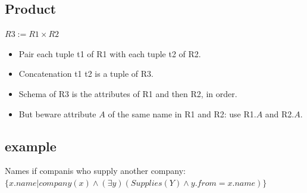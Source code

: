 \documentclass[a4paper]{article}
\begin{document}
        \subsection{Product}
            \begin{center}
                $R3:= R1 \times R2$
            \end{center}
            \begin{itemize}
                \item Pair each tuple t1 of R1 with each tuple t2 of R2.
                \item Concatenation t1 t2 is a tuple of R3.
                \item Schema of R3 is the attributes of R1 and then R2, in order.
                \item But beware attribute $A$ of the same name in R1 and R2: use R1.$A$ and R2.$A$.
            \end{itemize}
        \subsection{example}
            Names if companis who supply another company: \\
            $ \{x.name | company(x) \wedge (\exists y)(Supplies(Y) \wedge y.from = 
            x.name)\}$

                


    
\end{document}
